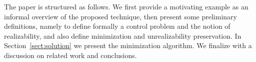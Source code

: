 The paper is structured as follows. We first provide a motivating example as an informal 
overview of the proposed technique, then present some preliminary definitions, 
namely to define formally a control problem and the notion of realizability, and also define minimization and unrealizability preservation. In 
Section~\ref{sect:solution} we present the minimization algorithm. We finalize with a discussion on 
related work and conclusions.
%
%
%
%
%
%
